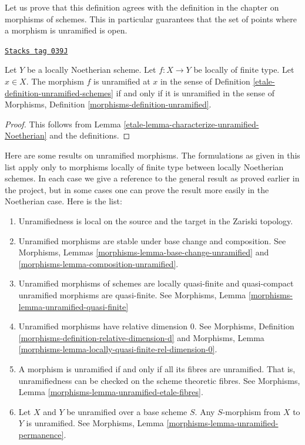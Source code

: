 Let us prove that this definition agrees with the definition in the
chapter on morphisms of schemes. This in particular guarantees that the
set of points where a morphism is unramified is open.

\begin{lemma}
\label{etale-lemma-unramified-definition}
\href{https://stacks.math.columbia.edu/tag/039J}{\texttt{Stacks tag 039J}}

Let $Y$ be a locally Noetherian scheme.
Let $f : X \to Y$ be locally of finite type.
Let $x \in X$. The morphism $f$ is unramified at $x$ in
the sense of Definition \ref{etale-definition-unramified-schemes}
if and only if it is unramified in
the sense of Morphisms, Definition \ref{morphisms-definition-unramified}.
\end{lemma}

\begin{proof}

This follows from Lemma \ref{etale-lemma-characterize-unramified-Noetherian}
and the definitions.
\end{proof}

Here are some results on unramified morphisms.
The formulations as given in this list apply only to
morphisms locally of finite type between locally Noetherian schemes.
In each case we give a reference to the general result as
proved earlier in the project, but in some cases one can
prove the result more easily in the Noetherian case.
Here is the list:
\begin{enumerate}
\item Unramifiedness is local on the source and the target in the Zariski
topology.
\item Unramified morphisms are stable under base change and composition.
See Morphisms, Lemmas \ref{morphisms-lemma-base-change-unramified}
and \ref{morphisms-lemma-composition-unramified}.
\item Unramified morphisms of schemes are locally quasi-finite
and quasi-compact unramified morphisms are quasi-finite.
See Morphisms, Lemma \ref{morphisms-lemma-unramified-quasi-finite}
\item Unramified morphisms have relative dimension $0$. See
Morphisms, Definition \ref{morphisms-definition-relative-dimension-d}
and
Morphisms, Lemma \ref{morphisms-lemma-locally-quasi-finite-rel-dimension-0}.
\item A morphism is unramified if and only if all its fibres are unramified.
That is, unramifiedness can be checked on the scheme theoretic fibres. See
Morphisms, Lemma \ref{morphisms-lemma-unramified-etale-fibres}.
\item Let $X$ and $Y$ be unramified over a base scheme $S$.
Any $S$-morphism from $X$ to $Y$ is unramified.
See Morphisms, Lemma \ref{morphisms-lemma-unramified-permanence}.
\end{enumerate}

